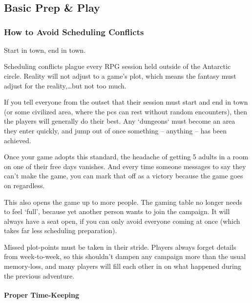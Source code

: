 \chapter{}

\section{Basic Prep \& Play}

\begin{multicols}{2}

\subsection{How to Avoid Scheduling Conflicts}

Start in town, end in town.

Scheduling conflicts plague every RPG session held outside of the Antarctic circle.
Reality will not adjust to a game's plot, which means the fantasy must adjust for the reality,\ldots but not too much.

If you tell everyone from the outset that their session must start and end in town (or some civilized area, where the \glspl{pc} can rest without random encounters), then the players will generally do their best.
Any `dungeons` must become an area they enter quickly, and jump out of once something -- anything -- has been achieved.

Once your game adopts this standard, the headache of getting 5 adults in a room on one of their free days vanishes.
And every time someone messages to say they can't make the game, you can mark that off as a victory because the game goes on regardless.

This also opens the game up to more people.
The gaming table no longer needs to feel `full', because yet another person wants to join the campaign.
It will always have a seat open, if you can only avoid everyone coming at once (which takes far less scheduling preparation).

Missed plot-points must be taken in their stride.
Players always forget details from week-to-week, so this shouldn't dampen any campaign more than the usual memory-loss, and many players will fill each other in on what happened during the previous \gls{adventure}.

\subsubsection{Proper Time-Keeping}


\end{multicols}

